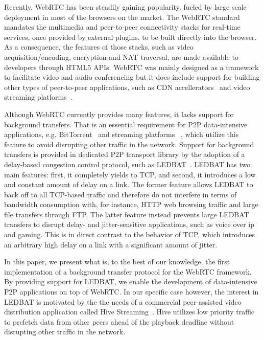 \documentclass{sig-alternate}
\begin{document}

Recently, WebRTC has been steadily gaining popularity, fueled by large scale deployment in
most of the browsers on the market. The WebRTC standard mandates the multimedia and
peer-to-peer connectivity stacks for real-time services, once provided by external
plugins, to be built directly into the browser. As a consequence, the features of those
stacks, such as video acquisition/encoding, encryption and NAT traversal, are made
available to developers through HTML5 APIs. WebRTC was mainly designed as a framework to
facilitate video and audio conferencing but it does include support for building other
types of peer-to-peer applications, such as CDN accellerators~\cite{peerCDN} and video
streaming platforms~\cite{nurminen2013p2p}.

Although WebRTC currently provides many features, it lacks support for background
transfers. That is an essential requirement for P2P data-intensive applications, e.g.
BitTorrent~\cite{bittorrent} and streaming platforms ~\cite{smoothcache}, which utilize
this feature to avoid disrupting other traffic in the network. Support for background
transfers is provided in dedicated P2P transport library by the adoption of a delay-based
congestion control protocol, such as LEDBAT~\cite{ledbat-rfc}. LEDBAT has two main
features: first, it completely yields to TCP, and second, it introduces a low and constant
amount of delay on a link. The former feature allows LEDBAT to back off to all TCP-based
traffic and therefore do not interfere in terms of bandwidth consumption with, for
instance, HTTP web browsing traffic and large file transfers through FTP. The latter
feature instead prevents large LEDBAT transfers to disrupt delay- and jitter-sensitive
applications, such as voice over ip and gaming. This is in direct contrast to the behavior
of TCP, which introduces an arbitrary high delay on a link with a significant amount of
jitter.

In this paper, we present what is, to the best of our knowledge, the first implementation
of a background transfer protocol for the WebRTC framework. By providing support for
LEDBAT, we enable the development of data-intensive P2P applications on top of
WebRTC. In our specific case however, the interest in LEDBAT is motivated by the the needs
of a commercial peer-assisted video distribution application called Hive
Streaming~\cite{hive}. Hive utilizes low priority traffic to prefetch data from other
peers ahead of the playback deadline without disrupting other traffic in the network.
\end{document}
